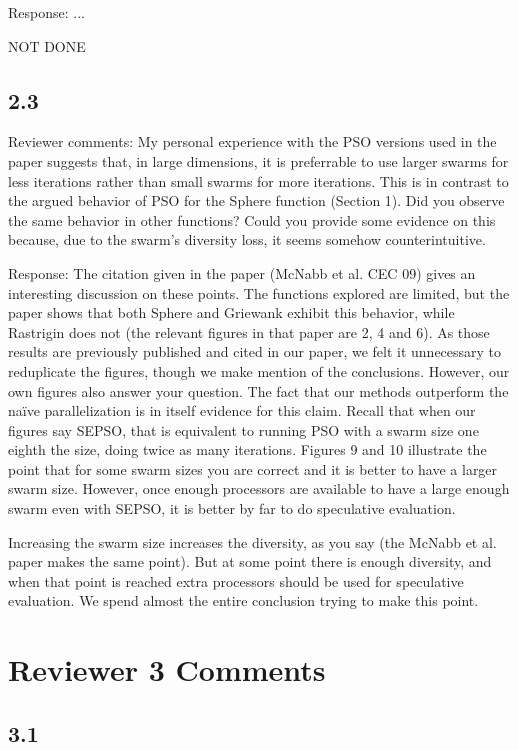 \documentclass[onecolumn, 12pt]{article}
\begin{document}
Response: ...

NOT DONE

\subsection*{2.3}

Reviewer comments: My personal experience with the PSO versions used in the
paper suggests that, in large dimensions, it is preferrable to use larger
swarms for less iterations rather than small swarms for more iterations. This
is in contrast to the argued behavior of PSO for the Sphere function (Section
1).  Did you observe the same behavior in other functions?  Could you provide
some evidence on this because, due to the swarm's diversity loss, it seems
somehow counterintuitive.

Response: The citation given in the paper (McNabb et al. CEC 09) gives an
interesting discussion on these points.  The functions explored are limited,
but the paper shows that both Sphere and Griewank exhibit this behavior, while
Rastrigin does not (the relevant figures in that paper are 2, 4 and 6).  As
those results are previously published and cited in our paper, we felt it
unnecessary to reduplicate the figures, though we make mention of the
conclusions.  However, our own figures also answer your question.  The fact
that our methods outperform the na\"ive parallelization is in itself evidence
for this claim.  Recall that when our figures say SEPSO, that is equivalent to
running PSO with a swarm size one eighth the size, doing twice as many
iterations.  Figures 9 and 10 illustrate the point that for some swarm sizes
you are correct and it is better to have a larger swarm size.  However, once
enough processors are available to have a large enough swarm even with SEPSO,
it is better by far to do speculative evaluation.

Increasing the swarm size increases the diversity, as you say (the McNabb et
al. paper makes the same point).  But at some point there is enough diversity,
and when that point is reached extra processors should be used for speculative
evaluation.  We spend almost the entire conclusion trying to make this point.

\section*{Reviewer 3 Comments}

\subsection*{3.1}
\end{document}
